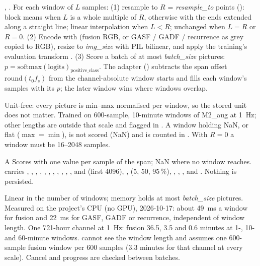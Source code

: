 , . For each window of $L$
samples: (1) resample to $R$ = \emph{resample\_to} points (): block
means when $L$ is a whole multiple of $R$, otherwise  with the
ends extended along a straight line; linear interpolation when $L < R$; unchanged when $L = R$
or $R = 0$. (2) Encode with  (fusion RGB, or GASF / GADF /
recurrence as grey copied to RGB), resize to \emph{img\_size} with PIL bilinear, and apply the
training's evaluation transform . (3) Score a batch of at most \emph{batch\_size} pictures:
$p = \mathrm{softmax}(\text{logits})_{\text{positive\_class}}$. The adapter
() subtracts the span offset
$\mathrm{round}(t_0 f_s)$ from the channel-absolute window starts and fills each window's samples
with its $p$; the later window wins where windows overlap.

Unit-free: every picture is min--max normalised per window, so the stored unit does not
matter. Trained on 600-sample, 10-minute windows of M2\_aug at 1~Hz; other lengths are outside
that scale and flagged in . A window holding NaN, or flat ($\max = \min$),
is not scored (NaN) and is counted in . With $R = 0$ a window must be
16--2048 samples.

A Scores with one value per sample of the span; NaN where no window reaches. 
carries , , , ,
, , , ,
, , ,  and 
(first 4096), ,  (5, 50, 95\,\%), ,
, ,  and . Nothing is persisted.

Linear in the number of windows; memory holds at most \emph{batch\_size} pictures. Measured on
the project's CPU (no GPU), 2026-10-17: about 49~ms a window for fusion and 22~ms for GASF,
GADF or recurrence, independent of window length. One 721-hour channel at 1~Hz: fusion 36.5,
3.5 and 0.6 minutes at 1-, 10- and 60-minute windows.  cannot see the window
length and assumes one 600-sample fusion window per 600 samples (3.3 minutes for that channel
at every scale). Cancel and progress are checked between batches.

